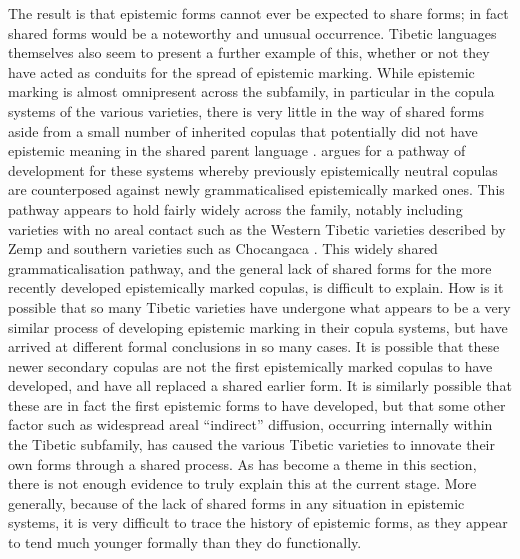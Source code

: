 The result is that epistemic forms cannot ever be expected to share forms; in fact shared forms would be a noteworthy and unusual occurrence. Tibetic languages themselves also seem to present a further example of this, whether or not they have acted as conduits for the spread of epistemic marking. While epistemic marking is almost omnipresent across the subfamily, in particular in the copula systems of the various varieties, there is very little in the way of shared forms aside from a small number of inherited copulas that potentially did not have epistemic meaning in the shared parent language \cites{Hill2017}{Zeisler2018}{Zemp2020}.  argues for a pathway of development for these systems whereby previously epistemically neutral copulas are counterposed against newly grammaticalised epistemically marked ones. This pathway appears to hold fairly widely across the family, notably including varieties with no areal contact such as the Western Tibetic varieties described by Zemp and southern varieties such as Chocangaca \cite[Tibetic: Bhutan,][]{Bodnaruk2023a}. This widely shared grammaticalisation pathway, and the general lack of shared forms for the more recently developed epistemically marked copulas, is difficult to explain. How is it possible that so many Tibetic varieties have undergone what appears to be a very similar process of developing epistemic marking in their copula systems, but have arrived at different formal conclusions in so many cases. It is possible that these newer secondary copulas are not the first epistemically marked copulas to have developed, and have all replaced a shared earlier form. It is similarly possible that these are in fact the first epistemic forms to have developed, but that some other factor such as widespread areal ``indirect'' diffusion, occurring internally within the Tibetic subfamily, has caused the various Tibetic varieties to innovate their own forms through a shared process. As has become a theme in this section, there is not enough evidence to truly explain this at the current stage. More generally, because of the lack of shared forms in any situation in epistemic systems, it is very difficult to trace the history of epistemic forms, as they appear to tend much younger formally than they do functionally.


